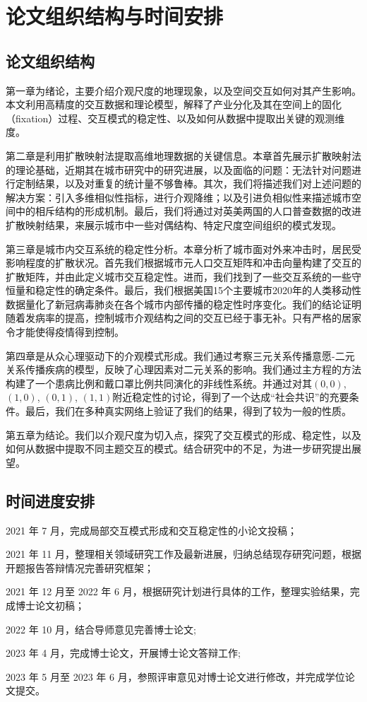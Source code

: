 \chapter{论文组织结构与时间安排}

\section{论文组织结构}

第一章为绪论，主要介绍介观尺度的地理现象，以及空间交互如何对其产生影响。本文利用高精度的交互数据和理论模型，解释了产业分化及其在空间上的固化（fixation）过程、交互模式的稳定性、以及如何从数据中提取出关键的观测维度。

第二章是利用扩散映射法提取高维地理数据的关键信息。本章首先展示扩散映射法的理论基础，近期其在城市研究中的研究进展，以及面临的问题：无法针对问题进行定制结果，以及对重复的统计量不够鲁棒。其次，我们将描述我们对上述问题的解决方案：引入多维相似性指标，进行介观降维；以及引进负相似性来描述城市空间中的相斥结构的形成机制。最后，我们将通过对英美两国的人口普查数据的改进扩散映射结果，来展示城市中一些对偶结构、特定尺度空间组织的模式发现。

第三章是城市内交互系统的稳定性分析。本章分析了城市面对外来冲击时，居民受影响程度的扩散状况。首先我们根据城市元人口交互矩阵和冲击向量构建了交互的扩散矩阵，并由此定义城市交互稳定性。进而，我们找到了一些交互系统的一些守恒量和稳定性的确定条件。最后，我们根据美国15个主要城市2020年的人类移动性数据量化了新冠病毒肺炎在各个城市内部传播的稳定性时序变化。我们的结论证明随着发病率的提高，控制城市介观结构之间的交互已经于事无补。只有严格的居家令才能使得疫情得到控制。

第四章是从众心理驱动下的介观模式形成。我们通过考察三元关系传播意愿-二元关系传播疾病的模型，反映了心理因素对二元关系的影响。我们通过主方程的方法构建了一个患病比例和戴口罩比例共同演化的非线性系统。并通过对其$(0,0)$, $(1,0)$, $(0,1)$, $(1,1)$附近稳定性的讨论，得到了一个达成“社会共识”的充要条件。最后，我们在多种真实网络上验证了我们的结果，得到了较为一般的性质。

第五章为结论。我们以介观尺度为切入点，探究了交互模式的形成、稳定性，以及如何从数据中提取不同主题交互的模式。结合研究中的不足，为进一步研究提出展望。



\section{时间进度安排}

2021 年 7 月，完成局部交互模式形成和交互稳定性的小论文投稿；

2021 年 11 月，整理相关领域研究工作及最新进展，归纳总结现存研究问题，根据开题报告答辩情况完善研究框架；

2021 年 12 月至 2022 年 6 月，根据研究计划进行具体的工作，整理实验结果，完成博士论文初稿；

2022 年 10 月，结合导师意见完善博士论文;

2023 年 4 月，完成博士论文，开展博士论文答辩工作;

2023 年 5 月至 2023 年 6 月，参照评审意见对博士论文进行修改，并完成学位论文提交。